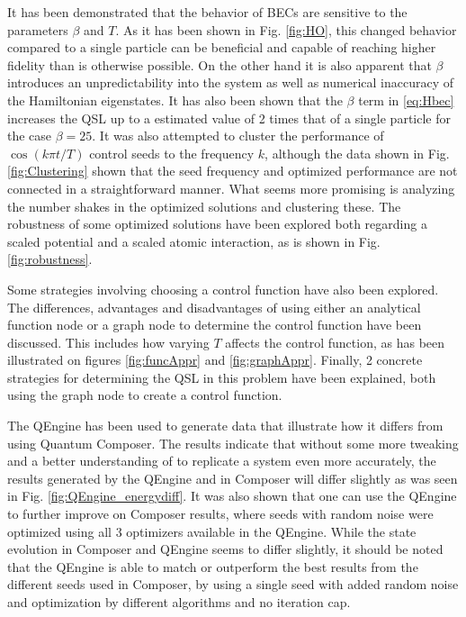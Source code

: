 \documentclass[a4paper, twocolumn]{revtex4-1}
\begin{document}
It has been demonstrated that the behavior of BECs are sensitive to the parameters $\beta$ and $T$. As it has been shown in Fig. \ref{fig:HO}, this changed behavior compared to a single particle can be beneficial and capable of reaching higher fidelity than is otherwise possible. On the other hand it is also apparent that $\beta$ introduces an unpredictability into the system as well as numerical inaccuracy of the Hamiltonian eigenstates. It has also been shown that the $\beta$ term in \eqref{eq:Hbec} increases the QSL up to a estimated value of 2 times that of a single particle for the case $\beta=25$. It was also attempted to cluster the performance of $\cos(k\pi t/T)$ control seeds to the frequency $k$, although the data shown in Fig. \ref{fig:Clustering} shown that the seed frequency and optimized performance are not connected in a straightforward manner. What seems more promising is analyzing the number shakes in the optimized solutions and clustering these. The robustness of some optimized solutions have been explored both regarding a scaled potential and a scaled atomic interaction, as is shown in Fig. \ref{fig:robustness}.

Some strategies involving choosing a control function have also been explored. The differences, advantages and disadvantages of using either an analytical function node or a graph node to determine the control function have been discussed. This includes how varying $T$ affects the control function, as has been illustrated on figures \ref{fig:funcAppr} and \ref{fig:graphAppr}. Finally, 2 concrete strategies for determining the QSL in this problem have been explained, both using the graph node to create a control function.

The QEngine has been used to generate data that illustrate how it differs from using Quantum Composer. The results indicate that without some more tweaking and a better understanding of to replicate a system even more accurately, the results generated by the QEngine and in Composer will differ slightly as was seen in Fig. \ref{fig:QEngine_energydiff}. It was also shown that one can use the QEngine to further improve on Composer results, where seeds with random noise were optimized using all 3 optimizers available in the QEngine. While the state evolution in Composer and QEngine seems to differ slightly, it should be noted that the QEngine is able to match or outperform the best results from the different seeds used in Composer, by using a single seed with added random noise and optimization by different algorithms and no iteration cap.
\end{document}

